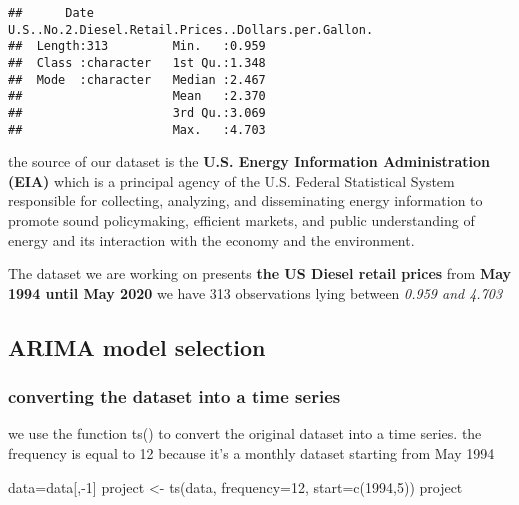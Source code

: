 \documentclass[
]{article}
\newenvironment{Shaded}{\begin{snugshade}}{\end{snugshade}}
\newcommand{\AttributeTok}[1]{\textcolor[rgb]{0.77,0.63,0.00}{#1}}
\newcommand{\DecValTok}[1]{\textcolor[rgb]{0.00,0.00,0.81}{#1}}
\newcommand{\FunctionTok}[1]{\textcolor[rgb]{0.00,0.00,0.00}{#1}}
\newcommand{\NormalTok}[1]{#1}
\newcommand{\OtherTok}[1]{\textcolor[rgb]{0.56,0.35,0.01}{#1}}
\newcommand{\SpecialCharTok}[1]{\textcolor[rgb]{0.00,0.00,0.00}{#1}}
\begin{document}
\begin{verbatim}
##      Date           U.S..No.2.Diesel.Retail.Prices..Dollars.per.Gallon.
##  Length:313         Min.   :0.959                                      
##  Class :character   1st Qu.:1.348                                      
##  Mode  :character   Median :2.467                                      
##                     Mean   :2.370                                      
##                     3rd Qu.:3.069                                      
##                     Max.   :4.703
\end{verbatim}

the source of our dataset is the \textbf{U.S. Energy Information
Administration (EIA)} which is a principal agency of the U.S. Federal
Statistical System responsible for collecting, analyzing, and
disseminating energy information to promote sound policymaking,
efficient markets, and public understanding of energy and its
interaction with the economy and the environment.

The dataset we are working on presents \textbf{the US Diesel retail
prices} from \textbf{May 1994 until May 2020} we have 313 observations
lying between \emph{0.959 and 4.703}

\hypertarget{arima-model-selection}{%
\subsection{ARIMA model selection}\label{arima-model-selection}}

\hypertarget{converting-the-dataset-into-a-time-series}{%
\subsubsection{converting the dataset into a time
series}\label{converting-the-dataset-into-a-time-series}}

we use the function ts() to convert the original dataset into a time
series. the frequency is equal to 12 because it's a monthly dataset
starting from May 1994

\begin{Shaded}
\begin{Highlighting}[]
\NormalTok{data}\OtherTok{=}\NormalTok{data[,}\SpecialCharTok{{-}}\DecValTok{1}\NormalTok{]}
\NormalTok{project  }\OtherTok{\textless{}{-}} \FunctionTok{ts}\NormalTok{(data, }\AttributeTok{frequency=}\DecValTok{12}\NormalTok{, }\AttributeTok{start=}\FunctionTok{c}\NormalTok{(}\DecValTok{1994}\NormalTok{,}\DecValTok{5}\NormalTok{))}
\NormalTok{project}
\end{Highlighting}
\end{Shaded}
\end{document}
